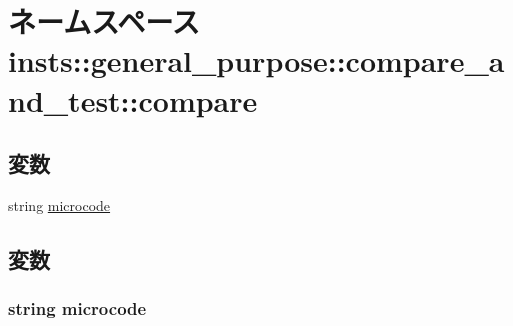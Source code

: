 \hypertarget{namespaceinsts_1_1general__purpose_1_1compare__and__test_1_1compare}{
\section{ネームスペース insts::general\_\-purpose::compare\_\-and\_\-test::compare}
\label{namespaceinsts_1_1general__purpose_1_1compare__and__test_1_1compare}
}
\subsection*{変数}
\begin{DoxyCompactItemize}
\item 
string \hyperlink{namespaceinsts_1_1general__purpose_1_1compare__and__test_1_1compare_a770f11a173e99389a8802f0107ed8f52}{microcode}
\end{DoxyCompactItemize}


\subsection{変数}
\hypertarget{namespaceinsts_1_1general__purpose_1_1compare__and__test_1_1compare_a770f11a173e99389a8802f0107ed8f52}{
\subsubsection[{microcode}]{\setlength{\rightskip}{0pt plus 5cm}string {\bf microcode}}}
\label{namespaceinsts_1_1general__purpose_1_1compare__and__test_1_1compare_a770f11a173e99389a8802f0107ed8f52}
